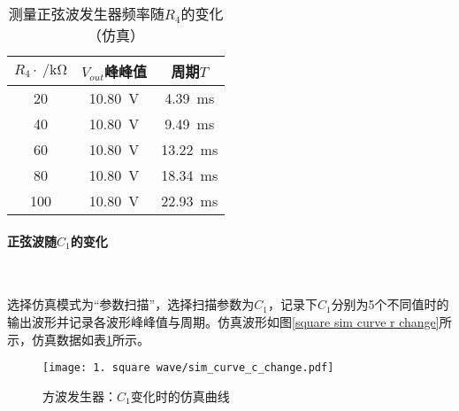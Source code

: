 \documentclass[UTF8]{ctexart}
\numberwithin{figure}{subsection}
\numberwithin{table}{subsection}
\numberwithin{equation}{subsection}
\begin{document}
\begin{table}[h]
    \begin{center}
        \caption{测量正弦波发生器频率随\(R_4\)的变化（仿真）}
        \begin{tabular}{|c|c|c|}
            \hline
            \(R_4\cdot \SI{}{\per\kilo\ohm}\) & \(V_{out}\)峰峰值 & 周期\(T\) \\
            \hline
            20 & \SI{10.80}{\volt} & \SI{4.39}{\milli\second} \\
            \hline
            40 & \SI{10.80}{\volt} & \SI{9.49}{\milli\second} \\
            \hline
            60 & \SI{10.80}{\volt} & \SI{13.22}{\milli\second} \\
            \hline
            80 & \SI{10.80}{\volt} & \SI{18.34}{\milli\second} \\
            \hline
            100 & \SI{10.80}{\volt} & \SI{22.93}{\milli\second} \\
            \hline
        \end{tabular}
    \end{center}
    \label{square wave f sim data r change}
\end{table}

\paragraph{正弦波随\(C_1\)的变化}~{}
\par 选择仿真模式为“参数扫描”，选择扫描参数为\(C_1\)，记录下\(C_1\)分别为5个不同值时的输出波形并记录各波形峰峰值与周期。仿真波形如图\ref{square sim curve r change}所示，仿真数据如表\ref{square wave f sim data r change}所示。


\begin{figure}[H]
    \begin{center}
        \caption{方波发生器：\(C_1\)变化时的仿真曲线}
        \texttt{[image: 1. square wave/sim\_curve\_c\_change.pdf]}
        \label{square sim curve c change}
    \end{center}
\end{figure}
\end{document}
